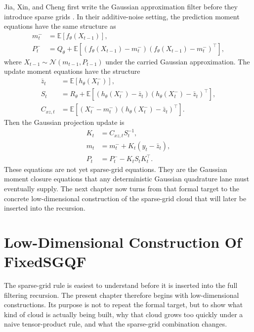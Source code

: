 \documentclass[11pt]{article}
\numberwithin{equation}{section}
\newcommand{\E}{\mathbb E}
\newcommand{\N}{\mathcal N}
\begin{document}
Jia, Xin, and Cheng first write the Gaussian approximation filter before they
introduce sparse grids \cite[Section 2.2]{jia2012sparsegrid}.  In their
additive-noise setting, the prediction moment equations have the same
structure as
\begin{align}
  m_t^-&=\E[f_\theta(X_{t-1})],
  \label{eq:p32-source-pred-mean}\\
  P_t^-&=
  Q_\theta+
  \E[(f_\theta(X_{t-1})-m_t^-)(f_\theta(X_{t-1})-m_t^-)^\top],
  \label{eq:p32-source-pred-cov}
\end{align}
where \(X_{t-1}\sim\N(m_{t-1},P_{t-1})\) under the carried Gaussian
approximation.  The update moment equations have the structure
\begin{align}
  \bar z_t&=\E[h_\theta(X_t^-)],
  \label{eq:p32-source-zbar}\\
  S_t&=
  R_\theta+
  \E[(h_\theta(X_t^-)-\bar z_t)(h_\theta(X_t^-)-\bar z_t)^\top],
  \label{eq:p32-source-S}\\
  C_{xz,t}&=
  \E[(X_t^- -m_t^-)(h_\theta(X_t^-)-\bar z_t)^\top].
  \label{eq:p32-source-Cxz}
\end{align}
Then the Gaussian projection update is
\begin{align}
  K_t&=C_{xz,t}S_t^{-1},
  \label{eq:p32-source-K}\\
  m_t&=m_t^-+K_t(y_t-\bar z_t),
  \label{eq:p32-source-m-update}\\
  P_t&=P_t^- -K_tS_tK_t^\top.
  \label{eq:p32-source-P-update}
\end{align}
These equations are not yet sparse-grid equations.  They are the Gaussian moment
closure equations that any deterministic Gaussian quadrature lane must eventually
supply.  The next chapter now turns from that formal target to the concrete
low-dimensional construction of the sparse-grid cloud that will later be inserted
into the recursion.

\section{Low-Dimensional Construction Of FixedSGQF}
\label{sec:p34-motivating-cases}

The sparse-grid rule is easiest to understand before it is inserted into the full
filtering recursion.  The present chapter therefore begins with low-dimensional
constructions.  Its purpose is not to repeat the formal target, but to show what
kind of cloud is actually being built, why that cloud grows too quickly under a
naive tensor-product rule, and what the sparse-grid combination changes.
\end{document}
